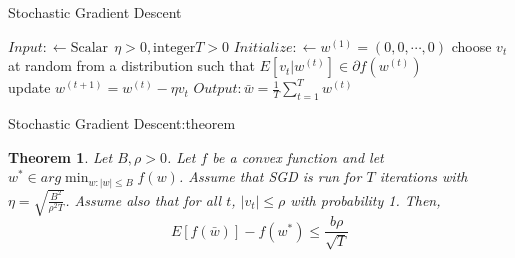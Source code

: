 \documentclass{beamer}
\newtheorem{thm}{Theorem}[subsection]
\begin{document}
\begin{frame}{Stochastic Gradient Descent}
	\begin{algorithm}[H]
		$Input: \gets \text{Scalar} \ \  \eta>0, \text{integer} T>0$ \;
		$Initialize: \gets w^{(1)} = (0,0,\cdots,0)$\;
		{    choose $v_t$ at random from a distribution such that $E[v_t|w^{(t)}] \in \partial f(w^{(t)})$
			\\
			 update			$w^{(t+1)} = w^{(t)} - \eta v_t$\;
							}
	$Output: \bar{w} = \frac{1}{T} \sum^{T}_{t=1} w^{(t)}$
	\caption{Stochastic Gradient Descent(SGD)}
	\end{algorithm}
\end{frame}
\begin{frame}{Stochastic Gradient Descent:theorem}
	\begin{thm}	
		Let $B,\rho>0$. Let $f$ be a convex function and let $w^* \in arg\min_{w:|w| \leq B} f(w)$. Assume that SGD is run for $T$ iterations with $\eta = \sqrt{\frac{B^2}{\rho^2 T}}$. Assume also that for all $t$, $|v_t| \leq \rho$ with probability 1. Then,
		\[E[f(\bar{w})] - f(w^*) \leq \frac{b \rho}{\sqrt{T}}\]
	\end{thm}
\end{frame}
\end{document}
